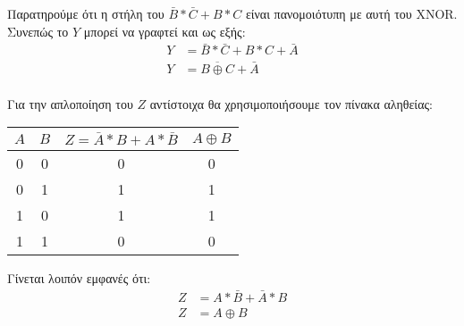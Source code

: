 \documentclass[draft]{article}
\begin{document}
Παρατηρούμε ότι η στήλη του $\bar{B} * \bar{C} + B * C$ είναι πανομοιότυπη με αυτή του XNOR. Συνεπώς το $Y$ μπορεί να γραφτεί και ως εξής:
\begin{align*}
  Y &= \bar{B} * \bar{C} + B * C + \bar{A} \\
  Y &= \overline{B \oplus C} + \bar{A}\\
\end{align*}

Για την απλοποίηση του $Z$ αντίστοιχα θα χρησιμοποιήσουμε τον πίνακα αληθείας:
\begin{center}
  \begin{tabular} {|c|c|c|c|}
    \hline \rule{0pt}{11pt}$A$ & $B$ & $Z = \bar{A} * B + A * \bar{B}$ & $A \oplus B$\\
    \hline 0 & 0 & 0 & 0\\
           0 & 1 & 1 & 1\\
           1 & 0 & 1 & 1\\
           1 & 1 & 0 & 0\\
    \hline
  \end{tabular}
\end{center}

Γίνεται λοιπόν εμφανές ότι:
\begin{align*}
  Z &= A * \bar{B} + \bar{A} * B\\
  Z &= A \oplus B
\end{align*}
\end{document}
